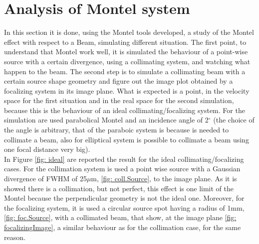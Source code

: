 \section{Analysis of Montel system}
In this section it is done, using the Montel tools developed, a study of the Montel effect with respect to a Beam, simulating different situation. The first point, to understand that Montel work well, it is simulated the behaviour of a point-wise source with a certain divergence, using a collimating system, and watching what happen to the beam. The  second step is to simulate a collimating beam with a certain source shape geometry and figure out the image plot obtained by a focalizing system in its image plane. What is expected is a point, in the velocity space for the first situation and in the real space for the second simulation, because this is the behaviour of an ideal collimating/focalizing system. For the simulation are used parabolical Montel and an incidence angle of 2$^{\circ} $ (the choice of the angle is arbitrary, that of the paraboic system is because is needed to collimate a beam, also for elliptical system is possible to collimate a beam using one focal distance very big).
\\
In Figure \ref{fig: ideal} are reported the result for the ideal collimating/focalizing cases.
For the collimation system is used a point wise source with a Gaussian divergence of FWHM of 25$\mu $m, \ref{fig: coll.Source}, to the image plane. As it is showed there is a collimation, but not perfect, this effect is one limit of the Montel because the perpendicular geometry is not the ideal one. Moreover, for the focalizing system, it is used a circular source spot having a radius of 1mm, \ref{fig: foc.Source}, with a collimated beam, that show, at the image plane \ref{fig: focalizingImage}, a similar behaviour as for the collimation case, for the same reason.
